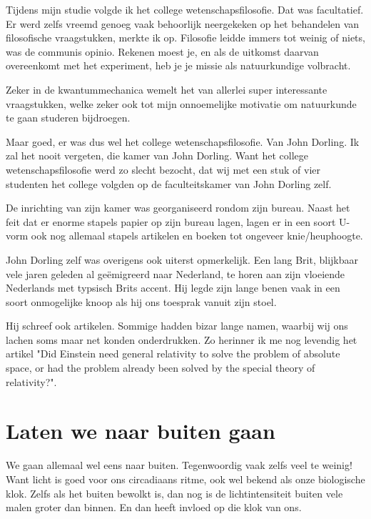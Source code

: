 \documentclass{article}      %
\begin{document}
Tijdens mijn studie volgde ik het college wetenschapsfilosofie. Dat was 
facultatief. Er werd zelfs vreemd genoeg vaak behoorlijk neergekeken op
het behandelen van filosofische vraagstukken, merkte ik op. Filosofie leidde
immers tot weinig of niets, was de communis opinio. Rekenen moest je, en als
de uitkomst daarvan overeenkomt met het experiment, heb je je missie als 
natuurkundige volbracht.

Zeker in de kwantummechanica wemelt het van allerlei super interessante 
vraagstukken, welke zeker ook tot mijn onnoemelijke motivatie om natuurkunde
te gaan studeren bijdroegen. 

Maar goed, er was dus wel het college wetenschapsfilosofie. Van John Dorling. 
Ik zal het nooit vergeten, die kamer van John Dorling. Want het college 
wetenschapsfilosofie werd zo slecht bezocht, dat wij met een stuk of vier
studenten het college volgden op de faculteitskamer van John Dorling zelf.

De inrichting van zijn kamer was georganiseerd rondom zijn bureau. Naast het 
feit dat er enorme stapels papier op zijn bureau lagen, lagen er in een 
soort U-vorm ook nog allemaal stapels artikelen en boeken tot ongeveer 
knie/heuphoogte. 

John Dorling zelf was overigens ook uiterst opmerkelijk. Een lang Brit, 
blijkbaar vele jaren geleden al geëmigreerd naar Nederland, te horen aan  
zijn vloeiende Nederlands met typsisch Brits accent. Hij legde zijn lange benen 
vaak in een soort onmogelijke knoop als hij ons toesprak vanuit zijn stoel. 

Hij schreef ook artikelen. Sommige hadden bizar lange namen, waarbij wij ons 
lachen soms maar net konden onderdrukken. Zo herinner ik me nog levendig het 
artikel "Did Einstein need general relativity to solve the problem of 
absolute space, or had the problem already been solved by the special theory 
of relativity?".


\section{Laten we naar buiten gaan}

We gaan allemaal wel eens naar buiten. Tegenwoordig vaak zelfs veel te weinig!
Want licht is goed voor ons circadiaans ritme, ook wel bekend als onze 
biologische klok. Zelfs als het buiten bewolkt is, dan nog is de lichtintensiteit  
buiten vele malen groter dan binnen. En dan heeft invloed op die klok van ons.
\end{document}
